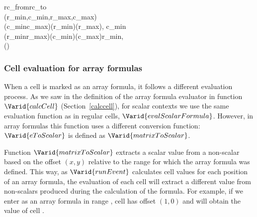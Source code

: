 \begin{hscode}
\>[7]{}\;\;\;rc_{from}\;rc_{to}\;\<[E]%
\\
\>[4]{}\<[7]%
\>[7]{}(r_{min},c_{min},r_{max},c_{max}){}\<[E]%
\\
\>[7]{}\<[10]%
\>[10]{}\mid (c_{min}\equiv c_{max})\mathrel{\wedge}(\geq r_{min})\mathrel{\wedge}(\leq r_{max}){}\<[58]%
\>[58]{}\to {}\;\llparenthesis \langle {}\rangle , \langle c_{min}\rangle \rrparenthesis {}\<[E]%
\\
\>[7]{}\<[10]%
\>[10]{}\mid (r_{min}\equiv r_{max})\mathrel{\wedge}(\geq c_{min})\mathrel{\wedge}(\leq c_{max}){}\<[58]%
\>[58]{}\to {}\;\llparenthesis \langle r_{min}\rangle , \langle {}\rangle \rrparenthesis {}\<[E]%
\\
\>[4]{}\<[7]%
\>[7]{}\anonymous \to {}\;(\;){}\<[E]%
\\
\>[B]{}\<[4]%
\>[4]{}\to {}\<[E]%
\ColumnHook
\end{hscode}\resethooks

\subsubsection{Cell evaluation for array formulas}
\label{arrayformulas}

When a cell is marked as an array formula, it follows a different evaluation
process. As we saw in the definition of the array formula evaluator in
function \ensuremath{\Varid{calcCell}} (Section~\ref{calccell}), for scalar contexts we use
the same evaluation function as in regular cells, \ensuremath{\Varid{evalScalarFormula}}.
However, in array formulas this function uses a different conversion function:
\ensuremath{\Varid{eToScalar}} is defined as \ensuremath{\Varid{matrixToScalar}}.

Function \ensuremath{\Varid{matrixToScalar}} extracts a scalar value from a non-scalar based on
the offset $(x, y)$ relative to the range for which the array formula was
defined. This way, as \ensuremath{\Varid{runEvent}} calculates cell values for each position of
an array formula, the evaluation of each cell will extract a different value
from non-scalars produced during the calculation of the formula. For example,
if we enter  as an array formula in range , cell  has
offset $(1, 0)$ and will obtain the value of cell .

